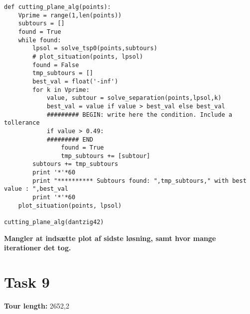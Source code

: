 \documentclass[a4paper,10pt]{article}
\begin{document}
\begin{lstlisting}
def cutting_plane_alg(points):
    Vprime = range(1,len(points))
    subtours = []
    found = True
    while found:
        lpsol = solve_tsp0(points,subtours)
        # plot_situation(points, lpsol)
        found = False
        tmp_subtours = []
        best_val = float('-inf')
        for k in Vprime:
            value, subtour = solve_separation(points,lpsol,k)
            best_val = value if value > best_val else best_val
            ######### BEGIN: write here the condition. Include a tollerance
            if value > 0.49: 
            ######### END
                found = True
                tmp_subtours += [subtour]
        subtours += tmp_subtours
        print '*'*60
        print "********** Subtours found: ",tmp_subtours," with best value : ",best_val
        print '*'*60
    plot_situation(points, lpsol)
    
cutting_plane_alg(dantzig42)
\end{lstlisting}

\textbf{Mangler at indsætte plot af sidste løsning, samt hvor mange iterationer det tog.}


\newpage
\section*{Task 9}
 
\textbf{Tour length:} 2652,2
\end{document}

